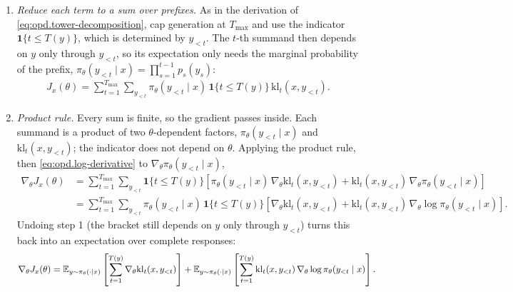 \begin{enumerate}
    \item \emph{Reduce each term to a sum over prefixes.} As in the derivation of
    \eqref{eq:opd.tower-decomposition}, cap generation at $T_{\max}$ and use the indicator
    $\mathbf{1}\{t\leq T(y)\}$, which is determined by $y_{<t}$. The $t$-th summand then
    depends on $y$ only through $y_{<t}$, so its expectation only needs the marginal
    probability of the prefix,
    $\pi_\theta(y_{<t}\mid x)=\prod_{s=1}^{t-1}p_s(y_s)$:
    \begin{align*}
        J_x(\theta)
        =
        \sum_{t=1}^{T_{\max}}
        \sum_{y_{<t}}
        \pi_\theta(y_{<t}\mid x)\,
        \mathbf{1}\{t\leq T(y)\}\,
        \mathrm{kl}_t(x,y_{<t}).
    \end{align*}
    \item \emph{Product rule.} Every sum is finite, so the gradient passes inside. Each
    summand is a product of two $\theta$-dependent factors, $\pi_\theta(y_{<t}\mid x)$ and
    $\mathrm{kl}_t(x,y_{<t})$; the indicator does not depend on $\theta$. Applying the
    product rule, then \eqref{eq:opd.log-derivative} to $\nabla_\theta\pi_\theta(y_{<t}\mid x)$,
    \begin{align*}
        \nabla_\theta J_x(\theta)
        &=
        \sum_{t=1}^{T_{\max}}
        \sum_{y_{<t}}
        \mathbf{1}\{t\leq T(y)\}
        \left[
            \pi_\theta(y_{<t}\mid x)\,\nabla_\theta\mathrm{kl}_t(x,y_{<t})
            +
            \mathrm{kl}_t(x,y_{<t})\,\nabla_\theta\pi_\theta(y_{<t}\mid x)
        \right]
        \\
        &=
        \sum_{t=1}^{T_{\max}}
        \sum_{y_{<t}}
        \pi_\theta(y_{<t}\mid x)\,
        \mathbf{1}\{t\leq T(y)\}
        \left[
            \nabla_\theta\mathrm{kl}_t(x,y_{<t})
            +
            \mathrm{kl}_t(x,y_{<t})\,\nabla_\theta\log\pi_\theta(y_{<t}\mid x)
        \right].
    \end{align*}
    Undoing step 1 (the bracket still depends on $y$ only through $y_{<t}$) turns this
    back into an expectation over complete responses:
    \begin{align*}
        \nabla_\theta J_x(\theta)
        =
        \mathbb{E}_{y\sim\pi_\theta(\cdot\mid x)}
        \left[
            \sum_{t=1}^{T(y)}\nabla_\theta\mathrm{kl}_t(x,y_{<t})
        \right]
        +
        \mathbb{E}_{y\sim\pi_\theta(\cdot\mid x)}
        \left[
            \sum_{t=1}^{T(y)}\mathrm{kl}_t(x,y_{<t})\,\nabla_\theta\log\pi_\theta(y_{<t}\mid x)
        \right].
    \end{align*}

\end{enumerate}
